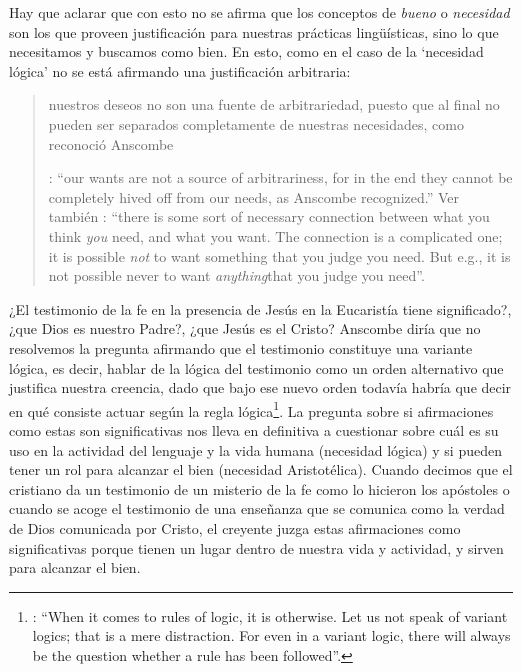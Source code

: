 Hay que aclarar que con esto no se afirma que los conceptos de \emph{bueno} o \emph{necesidad} son los que proveen justificación para nuestras prácticas lingüísticas, sino lo que necesitamos y buscamos como bien. En esto, como en el caso de la `necesidad lógica' no se está afirmando una justificación arbitraria: \blockquote[{\Cite[221]{teichmann2008ans}}: \enquote{our wants are not a source of arbitrariness, for in the end they cannot be completely hived off from our needs, as Anscombe recognized.} Ver también {\cite[31]{anscombe1981erp:mmph}}: \enquote{there is some sort of necessary connection between what you think \emph{you} need, and what you want. The connection is a complicated one; it is possible \emph{not} to want something that you judge you need. But e.g., it is not possible never to want \emph{anything}that you judge you need}.]{nuestros deseos no son una fuente de arbitrariedad, puesto que al final no pueden ser separados completamente de nuestras necesidades, como reconoció Anscombe}.

¿El testimonio de la fe en la presencia de Jesús en la Eucaristía tiene significado?, ¿que Dios es nuestro Padre?, ¿que Jesús es el Cristo? Anscombe diría que no resolvemos la pregunta afirmando que el testimonio constituye una variante lógica, es decir, hablar de la lógica del testimonio como un orden alternativo que justifica nuestra creencia, dado que bajo ese nuevo orden todavía habría que decir en qué consiste actuar según la regla lógica\footnote{\cite[Cf.][102]{anscombe1981erp:rrp}: \enquote{When it comes to rules of logic, it is otherwise. Let us not speak of variant logics; that is a mere distraction. For even in a variant logic, there will always be the question whether a rule has been followed}.}. La pregunta sobre si afirmaciones como estas son significativas nos lleva en definitiva a cuestionar sobre cuál es su uso en la actividad del lenguaje y la vida humana (necesidad lógica) y si pueden tener un rol para alcanzar el bien (necesidad Aristotélica). Cuando decimos que el cristiano da un testimonio de un misterio de la fe como lo hicieron los apóstoles o cuando se acoge el testimonio de una enseñanza que se comunica como la verdad de Dios comunicada por Cristo, el creyente juzga estas afirmaciones como significativas porque tienen un lugar dentro de nuestra vida y actividad, y sirven para alcanzar el bien.
